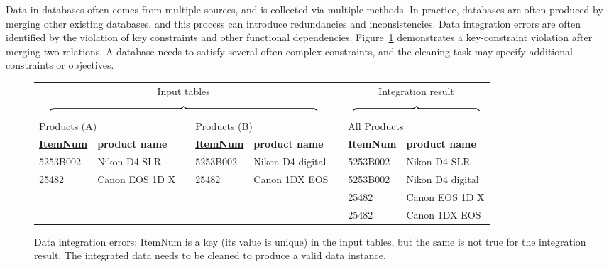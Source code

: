 Data in databases often comes from multiple sources, and is collected
via multiple methods. In practice, databases are often produced by
merging other existing databases, and this process can introduce
redundancies and inconsistencies. Data integration errors are often
identified by the violation of key constraints and other functional
dependencies. Figure~\ref{fig:integrationExample} demonstrates a
key-constraint violation after merging two relations. A database needs
to satisfy several often complex constraints, and the cleaning task
may specify additional constraints or objectives.

\begin{figure}
	\small{\begin{tabular}{|l|l|l|l|l|l|l|l|}
		\multicolumn{5}{c}{Input tables} & \multicolumn{1}{l}{}& \multicolumn{2}{c}{Integration result}\\
		\multicolumn{5}{c}{$\overbrace{\rule{9.5cm}{0pt}}$} & \multicolumn{1}{l}{}& \multicolumn{2}{c}{$\overbrace{\rule{4.5cm}{0pt}}$}\\
		\multicolumn{2}{l}{Products (A)} & \multicolumn{1}{l}{} & \multicolumn{2}{l}{Products (B)} & \multicolumn{1}{l}{} & \multicolumn{2}{l}{All Products}\\
		\cline{1-2}\cline{4-5}\cline{7-8}
		\textbf{\underline{ItemNum}} & \textbf{product name} & \multicolumn{1}{l|}{} & \textbf{\underline{ItemNum}} & \textbf{product name} & \multicolumn{1}{l|}{} & \textbf{ItemNum} & \textbf{product name}\\
		\cline{1-2}\cline{4-5}\cline{7-8}
		5253B002 & Nikon D4 SLR & \multicolumn{1}{l|}{} & 5253B002 & Nikon D4 digital & \multicolumn{1}{l|}{} & 5253B002 & Nikon D4 SLR\\
		\cline{1-2}\cline{4-5}\cline{7-8}
		25482 & Canon EOS 1D X & \multicolumn{1}{l|}{} & 25482 & Canon 1DX EOS & \multicolumn{1}{l|}{} & 5253B002 & Nikon D4 digital\\
		\cline{1-2}\cline{4-5}\cline{7-8}
		\multicolumn{6}{l|}{} & 25482 & Canon EOS 1D X\\
		\cline{7-8}
		\multicolumn{6}{l|}{} & 25482 & Canon 1DX EOS\\
		\cline{7-8}
		
	\end{tabular}}
	\caption{Data integration errors: ItemNum is a key (its value is unique) in the input tables, but the same is not true for the integration result. The integrated data needs to be cleaned to produce a valid data instance.}\label{fig:integrationExample}
\end{figure}

